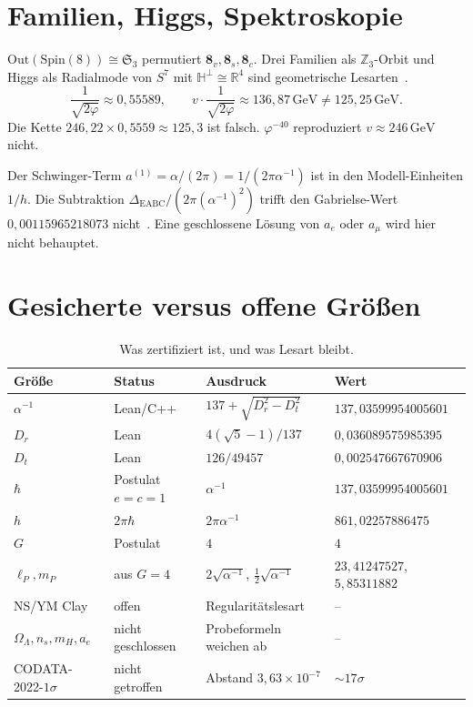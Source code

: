 \documentclass[11pt,a4paper]{article}
\theoremstyle{definition}
\theoremstyle{remark}
\numberwithin{equation}{section}
\begin{document}
\section{Familien, Higgs, Spektroskopie}

$\mathrm{Out}(\mathrm{Spin}(8))\cong\mathfrak{S}_3$ permutiert $\mathbf{8}_v,\mathbf{8}_s,\mathbf{8}_c$.
Drei Familien als $\mathbb{Z}_3$-Orbit und Higgs als Radialmode von $S^7$ mit $\mathbb{H}^\perp\cong\mathbb{R}^4$ sind geometrische Lesarten~\cite{adams}.
\begin{equation}
\frac{1}{\sqrt{2\varphi}}\approx 0{,}55589,\qquad
v\cdot\frac{1}{\sqrt{2\varphi}}\approx 136{,}87\,\mathrm{GeV}\neq 125{,}25\,\mathrm{GeV}.
\end{equation}
Die Kette $246{,}22\times 0{,}5559\approx 125{,}3$ ist falsch.
$\varphi^{-40}$ reproduziert $v\approx 246\,\mathrm{GeV}$ nicht.

Der Schwinger-Term $a^{(1)}=\alpha/(2\pi)=1/(2\pi\alpha^{-1})$ ist in den Modell-Einheiten $1/h$.
Die Subtraktion $\Delta_{\mathrm{EABC}}/(2\pi(\alpha^{-1})^2)$ trifft den Gabrielse-Wert $0{,}00115965218073$ nicht~\cite{gabrielse2023}.
Eine geschlossene Lösung von $a_e$ oder $a_\mu$ wird hier nicht behauptet.

\section{Gesicherte versus offene Größen}

\begin{table}[ht]
\centering
\small
\begin{tabular}{@{}llll@{}}
\toprule
Größe & Status & Ausdruck & Wert \\
\midrule
$\alpha^{-1}$ & Lean/C++ & $137+\sqrt{D_r^2-D_t^2}$ & $137{,}03599954005601$ \\
$D_r$ & Lean & $4(\sqrt{5}-1)/137$ & $0{,}036089575985395$ \\
$D_t$ & Lean & $126/49457$ & $0{,}002547667670906$ \\
$\hbar$ & Postulat $e=c=1$ & $\alpha^{-1}$ & $137{,}03599954005601$ \\
$h$ & $2\pi\hbar$ & $2\pi\alpha^{-1}$ & $861{,}02257886475$ \\
$G$ & Postulat & $4$ & $4$ \\
$\ell_P,m_P$ & aus $G=4$ & $2\sqrt{\alpha^{-1}}$, $\tfrac12\sqrt{\alpha^{-1}}$ & $23{,}41247527$, $5{,}85311882$ \\
\midrule
NS/YM Clay & offen & Regularitätslesart & -- \\
$\Omega_\Lambda,n_s,m_H,a_e$ & nicht geschlossen & Probeformeln weichen ab & -- \\
CODATA-2022-$1\sigma$ & nicht getroffen & Abstand $3{,}63\times 10^{-7}$ & $\sim 17\sigma$ \\
\bottomrule
\end{tabular}
\caption{Was zertifiziert ist, und was Lesart bleibt.}
\end{table}
\end{document}
